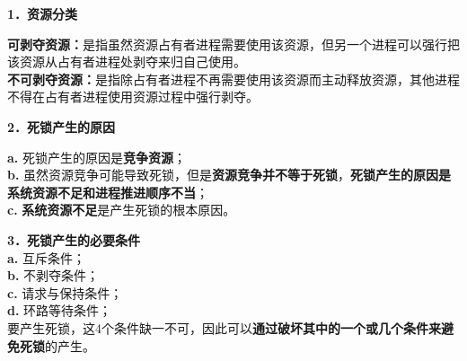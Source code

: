 \textbf{{1．资源分类}}

\textbf{可剥夺资源：}是指虽然资源占有者进程需要使用该资源，但另一个进程可以强行把该资源从占有者进程处剥夺来归自己使用。\\
\textbf{不可剥夺资源：}是指除占有者进程不再需要使用该资源而主动释放资源，其他进程不得在占有者进程使用资源过程中强行剥夺。

\textbf{{2．死锁产生的原因}}

\textbf{a.} 死锁产生的原因是{\textbf{竞争资源}}；\\
\textbf{b.}
虽然资源竞争可能导致死锁，但是\textbf{资源竞争并不等于死锁}，{\textbf{死锁产生的原因是系统资源不足和进程推进顺序不当}}；\\
\textbf{c.} {\textbf{系统资源不足}}是产生死锁的根本原因。

\textbf{{3．死锁产生的必要条件}}\\
\textbf{a.} 互斥条件；\\
\textbf{b.} 不剥夺条件；\\
\textbf{c.} 请求与保持条件；\\
\textbf{d.} 环路等待条件；\\
要产生死锁，这4个条件缺一不可，因此可以\textbf{通过破坏其中的一个或几个条件来避免死锁}的产生。

